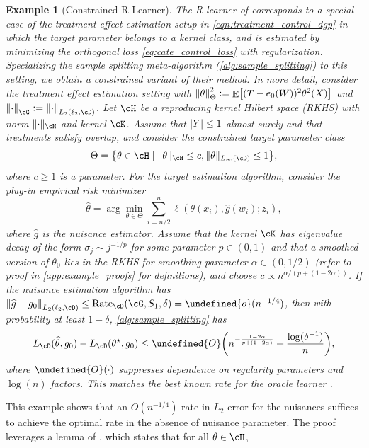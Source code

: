 \documentclass[11pt]{article} %
\newcommand{\preprint}[1]{\iftoggle{journal}{}{#1}}
\newcommand{\pref}[1]{\cref{#1}}
\theoremstyle{theorem}  %
\theoremstyle{plain}
\newtheorem{example}{Example}
\DeclarePairedDelimiter{\abs}{\lvert}{\rvert} %
\DeclarePairedDelimiter{\brk}{[}{]}
\DeclarePairedDelimiter{\crl}{\{}{\}}
\DeclarePairedDelimiter{\prn}{(}{)}
\DeclarePairedDelimiter{\nrm}{\|}{\|}
\DeclareMathOperator{\En}{\mathbb{E}}
\newcommand{\ls}{\ell}
\newcommand{\ldef}{\vcentcolon=}
\newcommand{\wt}[1]{\widetilde{#1}}
\newcommand{\wh}[1]{\widehat{#1}}
\let\wt\undefined
\newcommand{\wt}[1]{\widetilde{#1}}
\newenvironment{revone}{\color{black}}{\ignorespacesafterend}
\newcommand{\Ot}{\wt{O}}
\newcommand{\bigoh}{O}
\newcommand{\bigoht}{\Ot}
\newcommand{\poprisk}{L_{\cD}}
\newcommand{\varall}{z}
\newcommand{\varone}{w} %
\newcommand{\vartwo}{x} %
\newcommand{\estone}{\wh{g}}
\newcommand{\esttwo}{\wh{\theta}}
\newcommand{\nuisance}{\cG}
\newcommand{\target}{\Theta}
\newcommand{\Rate}{\mathrm{Rate}_{\cD}}
\newcommand{\besttwo}{\theta^{\star}}
\newcommand{\gtone}{g_0}
\newcommand{\sampleone}{S_1}
\begin{document}
\begin{revone}
\begin{example}[Constrained R-Learner]
  \label{ex:r_learner}
  The R-learner of \cite{nie2017quasi} corresponds to a special case of the treatment effect estimation setup in \pref{eqn:treatment_control_dgp} in which the target parameter belongs to a kernel class, and is estimated by minimizing the orthogonal loss \pref{eq:cate_control_loss} with regularization. Specializing the sample splitting meta-algorithm (\pref{alg:sample_splitting}) to this setting, we obtain a constrained variant of their method. \preprint{\\}In more detail, consider the treatment effect estimation setting with $\nrm*{\theta}_{\target}^2\ldef\En\brk*{(T-e_0(W))^{2}\theta^2(X)}$ and $\nrm*{\cdot}_{\cG}\ldef\nrm*{\cdot}_{L_2(\ell_2,\cD)}$. Let $\cH$ be a reproducing kernel Hilbert space (RKHS) with norm $\nrm{\cdot}_{\cH}$ and kernel $\cK$. Assume that $\abs{Y}\leq{}1$ almost surely and that treatments satisfy overlap, and consider the constrained target parameter class
\[
\target = \crl*{\theta\in\cH\mid{}\nrm{\theta}_{\cH}\leq{}c, \nrm{\theta}_{L_{\infty}(\cD)}\leq{}1}, 
\]
where $c\geq{}1$ is a parameter. For the target estimation algorithm, consider the plug-in empirical risk minimizer
\[
  \esttwo = \arg\min_{\theta \in \target}\sum_{i=n/2}^n \ell(\theta(\vartwo_i), \estone(\varone_i); \varall_i),
\]
where $\estone$ is the nuisance estimator. Assume that the kernel $\cK$ has eigenvalue decay of the form $\sigma_j\sim j^{-1/p}$ for some parameter $p\in(0,1)$ and that a smoothed version of $\theta_0$ lies in the RKHS for smoothing parameter $\alpha\in (0,1/2)$ (refer to proof in \pref{app:example_proofs} for definitions), and choose $c\propto{}n^{\alpha/(p+(1-2\alpha))}$. If the nuisance estimation algorithm has $\nrm*{\estone-\gtone}_{L_2(\ls_2,\cD)}\leq\Rate(\nuisance,\sampleone,\delta)=\wt{o}(n^{-1/4})$, then with probability at least $1-\delta$, \pref{alg:sample_splitting} has
\begin{equation}
  \label{eq:r_learner}
  \poprisk(\esttwo,\gtone) - \poprisk(\besttwo,\gtone)
  \leq \bigoht\prn*{n^{-\frac{1-2\alpha}{p+(1-2\alpha)}} + \frac{\log(\delta^{-1})}{n}},
\end{equation}
where $\bigoht(\cdot)$ suppresses dependence on regularity parameters and $\log(n)$ factors. This matches the best known rate for the oracle learner \citep{nie2017quasi}. 
\end{example}
This example shows that an $\bigoh(n^{-1/4})$ rate in $L_2$-error for the nuisances suffices to achieve the optimal rate in the absence of nuisance parameter. The proof leverages a lemma of \cite{mendelson2010regularization}, which states that for all $\theta\in\cH$,

\end{revone}
\end{document}
